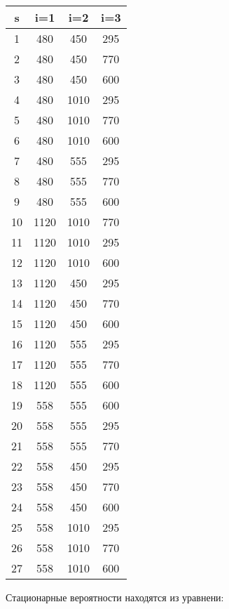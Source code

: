 \documentclass[14pt,a4paper,report]{report}
\begin{document}
 \begin{tabular}{| c | c | c | c | }
	\hline	 
	s & i=1 & i=2 & i=3 \\ \hline
	1 & 480 & 450 & 295 \\ \hline
	2 & 480 & 450 & 770 \\ \hline
	3 & 480 & 450 & 600 \\ \hline
	
	4 & 480 & 1010 & 295 \\ \hline
	5 & 480 & 1010 & 770 \\ \hline
	6 & 480 & 1010 & 600 \\ \hline
	
	7 & 480 & 555 & 295 \\ \hline
	8 & 480 & 555 & 770 \\ \hline
	9 & 480 & 555 & 600 \\ \hline
	
	10 & 1120 & 1010 & 770 \\ \hline
	11 & 1120 & 1010 & 295 \\ \hline
	12 & 1120 & 1010 & 600 \\ \hline
	
	13 & 1120 & 450 & 295 \\ \hline
	14 & 1120 & 450 & 770 \\ \hline
	15 & 1120 & 450 & 600 \\ \hline
	
	16 & 1120 & 555 & 295 \\ \hline
	17 & 1120 & 555 & 770 \\ \hline
	18 & 1120 & 555 & 600 \\ \hline
	
	19 & 558 & 555 & 600 \\ \hline
	20 & 558 & 555 & 295 \\ \hline
	21 & 558 & 555 & 770 \\ \hline
	
	22 & 558 & 450 & 295 \\ \hline
	23 & 558 & 450 & 770 \\ \hline
	24 & 558 & 450 & 600 \\ \hline
	
	25 & 558 & 1010 & 295 \\ \hline
	26 & 558 & 1010 & 770 \\ \hline
	27 & 558 & 1010 & 600 \\ \hline
	\end{tabular}
	
	Стационарные вероятности находятся из уравнени:
\end{document}
